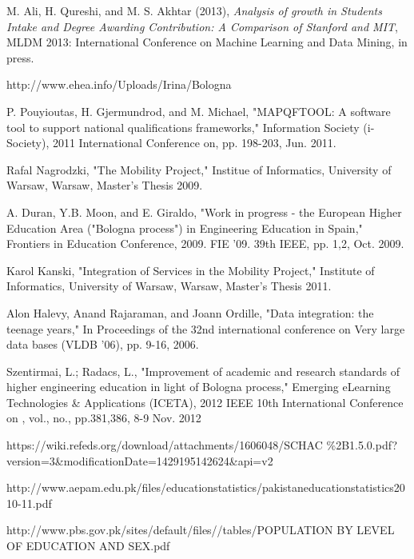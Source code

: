 \documentclass[12pt,a4paper,oneside]{book}
\begin{document}
\begin{thebibliography}{10}

M. Ali, H. Qureshi, and M. S. Akhtar (2013), \emph{Analysis of growth in Students Intake and Degree Awarding Contribution: A Comparison of Stanford and MIT}, MLDM 2013: International Conference on Machine Learning and Data Mining, in press.

http://www.ehea.info/Uploads/Irina/Bologna%

P. Pouyioutas, H. Gjermundrod, and M. Michael, "MAPQFTOOL: A software tool to support national qualifications frameworks," Information Society (i-Society), 2011 International Conference on, pp. 198-203, Jun. 2011.

Rafal Nagrodzki, "The Mobility Project," Institue of Informatics, University of Warsaw, Warsaw, Master's Thesis 2009.

A. Duran, Y.B. Moon, and E. Giraldo, "Work in progress - the European Higher Education Area ("Bologna process") in Engineering Education in Spain," Frontiers in Education Conference, 2009. FIE '09. 39th IEEE, pp. 1,2, Oct. 2009.

Karol Kanski, "Integration of Services in the Mobility Project," Institute of Informatics, University of Warsaw, Warsaw, Master's Thesis 2011.

Alon Halevy, Anand Rajaraman, and Joann Ordille, "Data integration: the teenage years," In Proceedings of the 32nd international conference on Very large data bases (VLDB '06), pp. 9-16, 2006.

Szentirmai, L.; Radacs, L., "Improvement of academic and research standards of higher engineering education in light of Bologna process," Emerging eLearning Technologies \& Applications (ICETA), 2012 IEEE 10th International Conference on , vol., no., pp.381,386, 8-9 Nov. 2012

https://wiki.refeds.org/download/attachments/1606048/SCHAC
\%2B1.5.0.pdf?version=3\&modificationDate=1429195142624\&api=v2

http://www.aepam.edu.pk/files/educationstatistics/pakistaneducationstatistics2010-11.pdf

http://www.pbs.gov.pk/sites/default/files//tables/POPULATION BY LEVEL OF EDUCATION AND SEX.pdf

\end{thebibliography}
\end{document}
